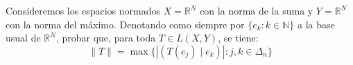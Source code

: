     \begin{ejercicio}
    Consideremos los espacios normados \( X = \mathbb{R}^N \) con la norma de la suma y \( Y = \mathbb{R}^N \) con la norma del máximo. Denotando como siempre por \( \{ e_k : k \in \mathbb{N} \} \) a la base usual de \( \mathbb{R}^N \), probar que, para toda \( T \in L(X,Y) \), se tiene:
    \[
    \|T\| = \max \{ |\left(T(e_j)\mid e_k \right)| : j,k \in \Delta_n \}
    \]
    \end{ejercicio}
    